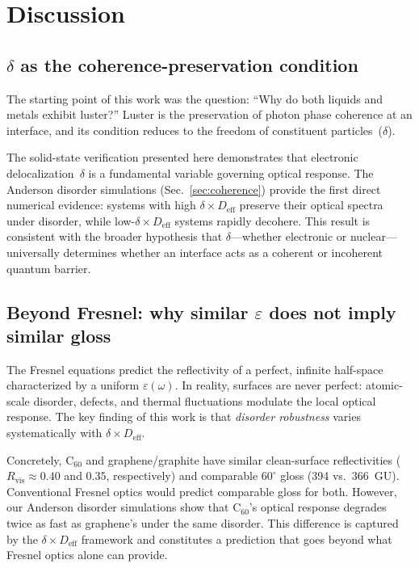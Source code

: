 \documentclass[twocolumn,showpacs,preprintnumbers,amsmath,amssymb,prb]{revtex4-2}
\begin{document}
\section{Discussion}
\label{sec:discussion}

\subsection{$\delta$ as the coherence-preservation condition}

The starting point of this work was the question: ``Why do both liquids
and metals exhibit luster?'' Luster is the preservation of photon phase
coherence at an interface, and its condition reduces to the freedom of
constituent particles~($\delta$).

The solid-state verification presented here demonstrates that electronic
delocalization~$\delta$ is a fundamental variable governing optical
response. The Anderson disorder simulations
(Sec.~\ref{sec:coherence}) provide the first direct numerical evidence:
systems with high $\delta \times D_\mathrm{eff}$ preserve their optical
spectra under disorder, while low-$\delta \times D_\mathrm{eff}$
systems rapidly decohere. This result is consistent with the broader
hypothesis that $\delta$---whether electronic or nuclear---universally
determines whether an interface acts as a coherent or incoherent quantum
barrier.

\subsection{Beyond Fresnel: why similar $\varepsilon$ does not imply
  similar gloss}

The Fresnel equations predict the reflectivity of a perfect, infinite
half-space characterized by a uniform $\varepsilon(\omega)$. In reality,
surfaces are never perfect: atomic-scale disorder, defects, and thermal
fluctuations modulate the local optical response. The key finding of
this work is that \emph{disorder robustness} varies systematically with
$\delta \times D_\mathrm{eff}$.

Concretely, C$_{60}$ and graphene/graphite have similar clean-surface
reflectivities ($R_\mathrm{vis} \approx 0.40$ and $0.35$,
respectively) and comparable $60^\circ$ gloss (394 vs.\ 366~GU).
Conventional Fresnel optics would predict comparable gloss for both.
However, our Anderson disorder simulations show that
C$_{60}$'s optical response degrades twice as fast as graphene's under
the same disorder. This difference is captured by the
$\delta \times D_\mathrm{eff}$ framework and constitutes a prediction
that goes beyond what Fresnel optics alone can provide.
\end{document}
